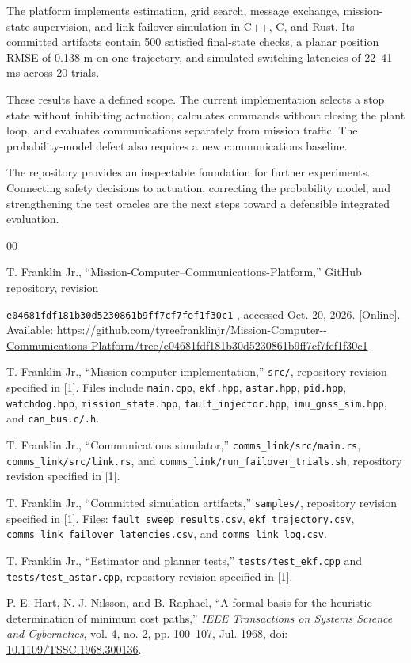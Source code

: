 \documentclass[conference]{IEEEtran}
\newcommand{\revision}{
  \nolinkurl{e04681fdf181b30d5230861b9ff7cf7fef1f30c1}
}
\begin{document}
The platform implements estimation, grid search,
message exchange, mission-state supervision, and
link-failover simulation in C++, C, and Rust.
Its committed artifacts contain 500 satisfied
final-state checks, a planar position RMSE of
0.138 m on one trajectory, and simulated switching
latencies of 22--41 ms across 20 trials.

These results have a defined scope. The current
implementation selects a stop state without inhibiting
actuation, calculates commands without closing the
plant loop, and evaluates communications separately
from mission traffic. The probability-model defect
also requires a new communications baseline.

The repository provides an inspectable foundation for
further experiments. Connecting safety decisions to
actuation, correcting the probability model, and
strengthening the test oracles are the next steps
toward a defensible integrated evaluation.

\begin{thebibliography}{00}

T. Franklin Jr.,
``Mission-Computer--Communications-Platform,''
GitHub repository, revision
\revision, accessed Oct. 20, 2026.
[Online]. Available:
\url{https://github.com/tyreefranklinjr/Mission-Computer--Communications-Platform/tree/e04681fdf181b30d5230861b9ff7cf7fef1f30c1}

T. Franklin Jr.,
``Mission-computer implementation,''
\texttt{src/}, repository revision specified in [1].
Files include \texttt{main.cpp}, \texttt{ekf.hpp},
\texttt{astar.hpp}, \texttt{pid.hpp},
\texttt{watchdog.hpp}, \texttt{mission\_state.hpp},
\texttt{fault\_injector.hpp},
\texttt{imu\_gnss\_sim.hpp}, and
\texttt{can\_bus.c/.h}.

T. Franklin Jr.,
``Communications simulator,''
\texttt{comms\_link/src/main.rs},
\texttt{comms\_link/src/link.rs}, and
\texttt{comms\_link/run\_failover\_trials.sh},
repository revision specified in [1].

T. Franklin Jr.,
``Committed simulation artifacts,''
\texttt{samples/}, repository revision specified in [1].
Files:
\texttt{fault\_sweep\_results.csv},
\texttt{ekf\_trajectory.csv},
\texttt{comms\_link\_failover\_latencies.csv}, and
\texttt{comms\_link\_log.csv}.

T. Franklin Jr.,
``Estimator and planner tests,''
\texttt{tests/test\_ekf.cpp} and
\texttt{tests/test\_astar.cpp},
repository revision specified in [1].

P. E. Hart, N. J. Nilsson, and B. Raphael,
``A formal basis for the heuristic determination
of minimum cost paths,''
\emph{IEEE Transactions on Systems Science and Cybernetics},
vol. 4, no. 2, pp. 100--107, Jul. 1968,
doi: \href{https://doi.org/10.1109/TSSC.1968.300136}
{10.1109/TSSC.1968.300136}.

\end{thebibliography}
\end{document}

